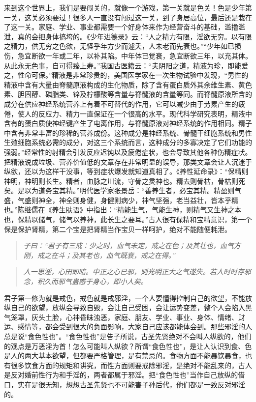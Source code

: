 来到这个世界上，我们是要闯关的，就像一个游戏，第一关就是色关！色是少年第一关，这关必须要过！很多人一直没有闯过这一关，到了身居高位，最后还是栽在了这一关。家庭、学业、事业都需要一个好身体来作为经营奋斗的基础，滥撸滥泄，真的会把身体搞垮的。《少年进德录》云：“人之精力有限，淫欲无穷。以有限之精力，供无穷之色欲，无怪乎年方少而遽夭，人未老而先衰也。”“少年如已损伤，急宜断欲一年或二年，以补其陷。中年体已觉衰，急宜断欲三年，以充其体。从此永无色事，自可得臻上寿。”我国古医籍云：“夫阴阳之道，精液为珍，即能爱之，性命可保。”精液是非常珍贵的，美国医学家在一次生物试验中发现，“男性的精液中含有大量由脊髓原液构成的生化物质，除了含有蛋白质外其余维生素、黄色素、胆固醇、磷脂类、锌及柠檬酸等含量与脊髓液的含量等同。而脊髓原液所含的成分在供应神经系统营养上有着不可替代的作用，它可以减少由于劳累产生的疲倦，使人的反应力、精力一直保证在一个很高的水平。现代科学研究表明，精液中含有的蛋白质使神经键产生了电离作用，与脊髓原液对神经系统的作用相同。精子中含有非常丰富的珍稀的营养成份。这种成分是神经系统、骨髓干细胞系统和男性生殖细胞系统必需的成分，对这三个系统而言，这种成分的多寡决定了它们功能的强弱。”经常性的射精会引发反应迟钝以及疲倦症状，也会导致其他各种伤精症状。把精液说成垃圾、营养价值低的文章存在非常明显的误导，那类文章会让人沉迷于纵欲，还以为这样干没事，等到症状爆发就知道真相了。《养性延命录》：“保精则神明，神明则长生。精者，血脉之川流，守骨之灵神也。精去则骨枯，骨枯则死矣。是以为道务宝其精。”明代医学家张景岳：“善养生者，必宝其精。精盈则气盛，气盛则神全，神全则身健，身健则病少，神气坚强，老当益壮，皆本乎精也。”陈继儒在《养生肤语》中指出：“精能生气，气能生神，则精气又生神之本也，保精以储气，储气以养神，此长生之要耳。”古人很有保精和宝精意识，第一个保是保护肾精，第二个宝是把肾精当作宝贝一样呵护，绝对不能随便耗泄。

\begin{quote}\it
    子曰：“君子有三戒：少之时，血气未定，戒之在色；及其壮也，血气方刚，戒之在斗；及其老也，血气既衰，戒之在得。”
\end{quote}

\begin{quote}\it
    人一思淫，心田即暗。中正之心已邪，则光明正大之气遂失。若人时时存邪念，积久而邪气蛊惑于身心，即小人矣。
\end{quote}

君子第一修为就是戒色，戒色就是戒邪淫，一个人要懂得控制自己的欲望，不能放纵自己的欲望，放纵会导致自毁，会让自己受困，会让运势变差，整个人会陷入黑气笼罩，灰头土脸，心神昏昧浊恶，家庭、朋友、学业、事业、身体、情绪、财运、感情等，都会受到很大的负面影响，大家自己应该都能体会到。那些邪淫的人总是说“食色性也”。“食色性也”是告子所说，古圣先贤绝对不会叫人纵欲的，他们的观点是万恶淫为首！怎么可能叫人纵欲？所谓“食色性也”，是让人认识到食、色是人的两大基本欲望，但都要严格管理，是有禁忌的。食物方面不能暴饮暴食，也有很多饮食方面的规矩和讲究，而性方面则要戒除邪淫，是绝对不能乱来的，古人是反对婚前性行为和手淫的，两者都属于邪淫。把“食色性也”当作自己放纵的借口，实在是很无知，想想古圣先贤也不可能害子孙后代，他们都是一致反对邪淫的。

